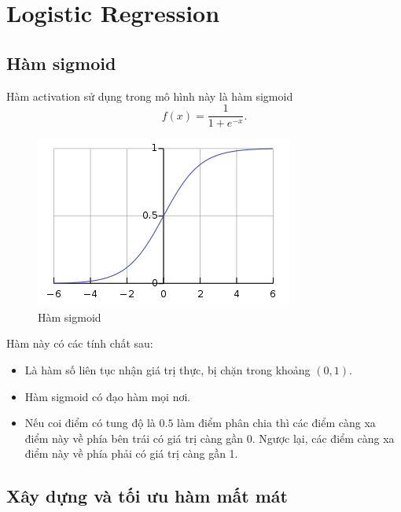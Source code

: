 \documentclass[]{article}
\begin{document}
\section{Logistic Regression}
\subsection{Hàm sigmoid}
Hàm activation sử dụng trong mô hình này là hàm sigmoid
$$f(x)=\frac{1}{1+e^{-x}}.$$
\begin{figure}[h!]
	\centering
	\includegraphics[width=.7\linewidth]{sigmoid}
	\caption{Hàm sigmoid}
\end{figure}

\noindent Hàm này có các tính chất sau:
\begin{itemize}
	\item Là hàm số liên tục nhận giá trị thực, bị chặn trong khoảng $(0, 1).$
	\item Hàm sigmoid có đạo hàm mọi nơi.
	\item Nếu coi điểm có tung độ là $0.5$ làm điểm phân chia thì các điểm càng xa điểm này về phía bên trái có giá trị càng gần 0. Ngược lại, các điểm càng xa điểm này về phía phải có giá trị càng gần 1.
\end{itemize}

\subsection{Xây dựng và tối ưu hàm mất mát}
\end{document}
